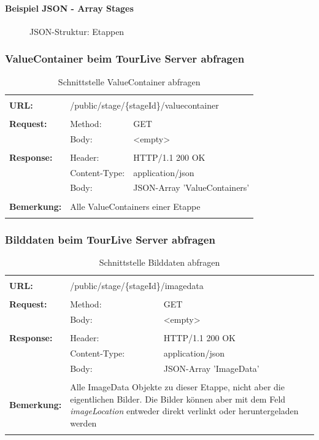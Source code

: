 \paragraph{Beispiel JSON - Array Stages}
\begin{figure}[H]
	\centering
	
	\caption{JSON-Struktur: Etappen}
\end{figure}

\newpage
\subsubsection{ValueContainer beim TourLive Server abfragen}
\begin{longtable}{ p{2.5cm} || p{3.5cm} p{5.5cm}}
&  \\ [-1.5ex]
	\textbf{URL:} & \multicolumn{2}{l}{/public/stage/\{stageId\}/valuecontainer}  \\ [1ex] \hline & &  \\ [-1.5ex]
	\textbf{Request:} & Method: & GET \\
		& Body: & <empty> \\ [1ex] \hline & &  \\ [-1.5ex]
	\textbf{Response:} &  Header: & HTTP/1.1 200 OK \\
		& Content-Type: & application/json \\
		& Body: & JSON-Array 'ValueContainers' \\ [1ex] \hline & &  \\ [-1.5ex]
	\textbf{Bemerkung:} & \multicolumn{2}{p{9cm}}{Alle ValueContainers einer Etappe} \\ [1ex] 
\caption{Schnittstelle ValueContainer abfragen}
\end{longtable}

\subsubsection{Bilddaten beim TourLive Server abfragen}
\begin{longtable}{ p{2.5cm} || p{3.5cm} p{5.5cm}}
&  \\ [-1.5ex]
	\textbf{URL:} & \multicolumn{2}{l}{/public/stage/\{stageId\}/imagedata}  \\ [1ex] \hline & &  \\ [-1.5ex]
	\textbf{Request:} & Method: & GET \\
		& Body: & <empty> \\ [1ex] \hline & &  \\ [-1.5ex]
	\textbf{Response:} &  Header: & HTTP/1.1 200 OK \\
		& Content-Type: & application/json \\
		& Body: & JSON-Array 'ImageData' \\ [1ex] \hline & &  \\ [-1.5ex]
	\textbf{Bemerkung:} & \multicolumn{2}{p{9cm}}{Alle ImageData Objekte zu dieser Etappe, nicht aber die eigentlichen Bilder. Die Bilder können aber mit dem Feld \textit{imageLocation} entweder direkt verlinkt oder heruntergeladen werden} \\ [1ex]
\caption{Schnittstelle Bilddaten abfragen}
\end{longtable}

